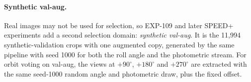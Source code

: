 \paragraph{Synthetic val-aug.}
Real images may not be used for selection, so EXP-109 and later SPEED+ experiments add a second selection domain: \emph{synthetic val-aug}. It is the 11{,}994 synthetic-validation crops with one augmented copy, generated by the same pipeline with seed 1000 for both the roll angle and the photometric stream. For orbit voting on val-aug, the views at $+90^\circ$, $+180^\circ$ and $+270^\circ$ are extracted with the same seed-1000 random angle and photometric draw, plus the fixed offset.

